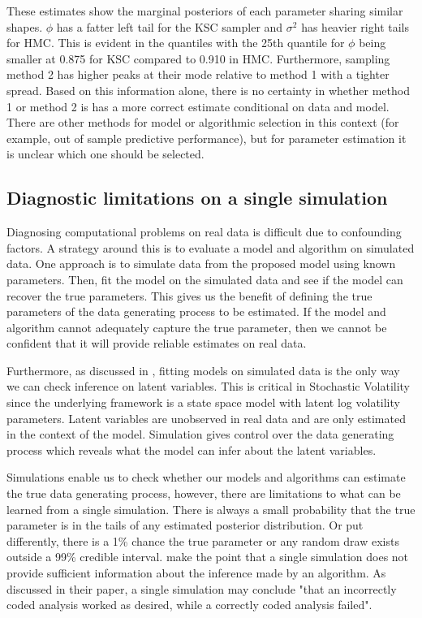 \documentclass[12pt, a4paper]{article}
\begin{document}
    These estimates show the marginal posteriors of each parameter sharing similar shapes. $\phi$  has a fatter left tail for the KSC sampler and $\sigma^2$ has heavier right tails for HMC. This is evident in the quantiles with the 25th quantile for $\phi$ being smaller at 0.875 for KSC compared to 0.910 in HMC. Furthermore, sampling method 2 has higher peaks at their mode relative to method 1 with a tighter spread. Based on this information alone, there is no certainty in whether method 1 or method 2 is has a more correct estimate conditional on data and model. There are other methods for model or algorithmic selection in this context (for example, out of sample predictive performance), but for parameter estimation it is unclear which one should be selected. 

\subsection{Diagnostic limitations on a single simulation}
    Diagnosing computational problems on real data is difficult due to confounding factors. A strategy around this is to evaluate a model and algorithm on simulated data. One approach is to simulate data from the proposed model using known parameters. Then, fit the model on the simulated data and see if the model can recover the true parameters. This gives us the benefit of defining the true parameters of the data generating process to be estimated. If the model and algorithm cannot adequately capture the true parameter, then we cannot be confident that it will provide reliable estimates on real data.

    Furthermore, as discussed in \citet{gelman2020bayesian}, fitting models on simulated data is the only way we can check inference on latent variables. This is critical in Stochastic Volatility since the underlying framework is a state space model with latent log volatility parameters. Latent variables are unobserved in real data and are only estimated in the context of the model. Simulation gives control over the data generating process which reveals what the model can infer about the latent variables. 

    Simulations enable us to check whether our models and algorithms can estimate the true data generating process, however, there are limitations to what can be learned from a single simulation. There is always a small probability that the true parameter is in the tails of any estimated posterior distribution. Or put differently, there is a 1\% chance the true parameter or any random draw exists outside a 99\% credible interval. \cite{talts2018validating} make the point that a single simulation does not provide sufficient information about the inference made by an algorithm. As discussed in their paper, a single simulation may conclude "that an incorrectly coded analysis worked as desired, while a correctly coded analysis failed". 
\end{document}
